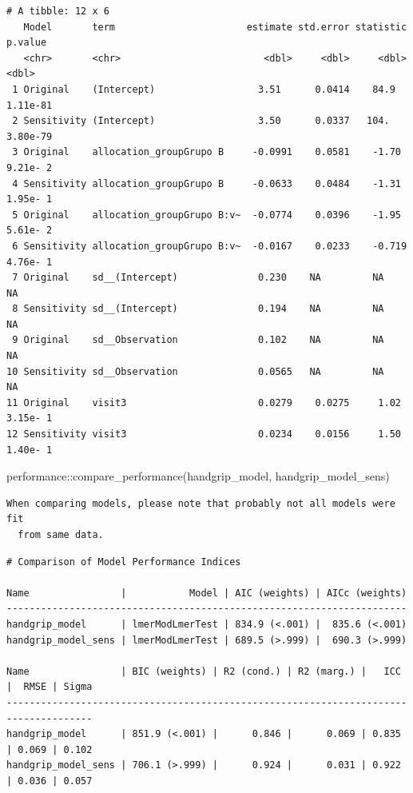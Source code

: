 \documentclass[
  letterpaper,
  DIV=11,
  numbers=noendperiod]{scrartcl}
\newenvironment{Shaded}{\begin{snugshade}}{\end{snugshade}}
\newcommand{\FunctionTok}[1]{\textcolor[rgb]{0.28,0.35,0.67}{#1}}
\newcommand{\NormalTok}[1]{\textcolor[rgb]{0.00,0.23,0.31}{#1}}
\newcommand{\SpecialCharTok}[1]{\textcolor[rgb]{0.37,0.37,0.37}{#1}}
\begin{document}
\begin{verbatim}
# A tibble: 12 x 6
   Model       term                       estimate std.error statistic   p.value
   <chr>       <chr>                         <dbl>     <dbl>     <dbl>     <dbl>
 1 Original    (Intercept)                  3.51      0.0414    84.9    1.11e-81
 2 Sensitivity (Intercept)                  3.50      0.0337   104.     3.80e-79
 3 Original    allocation_groupGrupo B     -0.0991    0.0581    -1.70   9.21e- 2
 4 Sensitivity allocation_groupGrupo B     -0.0633    0.0484    -1.31   1.95e- 1
 5 Original    allocation_groupGrupo B:v~  -0.0774    0.0396    -1.95   5.61e- 2
 6 Sensitivity allocation_groupGrupo B:v~  -0.0167    0.0233    -0.719  4.76e- 1
 7 Original    sd__(Intercept)              0.230    NA         NA     NA       
 8 Sensitivity sd__(Intercept)              0.194    NA         NA     NA       
 9 Original    sd__Observation              0.102    NA         NA     NA       
10 Sensitivity sd__Observation              0.0565   NA         NA     NA       
11 Original    visit3                       0.0279    0.0275     1.02   3.15e- 1
12 Sensitivity visit3                       0.0234    0.0156     1.50   1.40e- 1
\end{verbatim}

\begin{Shaded}
\begin{Highlighting}[]
\NormalTok{performance}\SpecialCharTok{::}\FunctionTok{compare\_performance}\NormalTok{(handgrip\_model, handgrip\_model\_sens)}
\end{Highlighting}
\end{Shaded}

\begin{verbatim}
When comparing models, please note that probably not all models were fit
  from same data.
\end{verbatim}

\begin{verbatim}
# Comparison of Model Performance Indices

Name                |           Model | AIC (weights) | AICc (weights)
----------------------------------------------------------------------
handgrip_model      | lmerModLmerTest | 834.9 (<.001) |  835.6 (<.001)
handgrip_model_sens | lmerModLmerTest | 689.5 (>.999) |  690.3 (>.999)

Name                | BIC (weights) | R2 (cond.) | R2 (marg.) |   ICC |  RMSE | Sigma
-------------------------------------------------------------------------------------
handgrip_model      | 851.9 (<.001) |      0.846 |      0.069 | 0.835 | 0.069 | 0.102
handgrip_model_sens | 706.1 (>.999) |      0.924 |      0.031 | 0.922 | 0.036 | 0.057
\end{verbatim}
\end{document}
